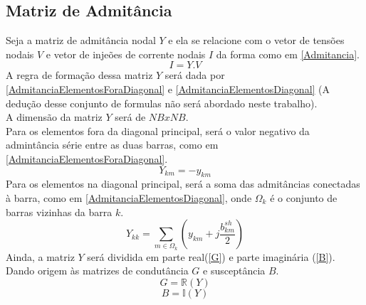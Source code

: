 




\subsection{Matriz de Admitância}
Seja a matriz de admitância nodal $Y$ e ela se relacione com o vetor de tensões nodais $V$ e vetor de injeões de corrente nodais $I$ da forma como em \ref{Admitancia}.
\begin{equation}
    I = Y.V
    \label{Admitancia}
\end{equation}
A regra de formação dessa matriz $Y$ será dada por \ref{AdmitanciaElementosForaDiagonal} e \ref{AdmitanciaElementosDiagonal} (A dedução desse conjunto de formulas não será abordado neste trabalho).\\
A dimensão da matriz $Y$ será de $NBxNB$.\\
Para os elementos fora da diagonal principal, será o valor negativo da admintância série entre as duas barras, como em \ref{AdmitanciaElementosForaDiagonal}.
\begin{equation}
    Y_{km} = -y_{km}
    \label{AdmitanciaElementosForaDiagonal}
\end{equation}
Para os elementos na diagonal principal, será a soma das admitâncias conectadas à barra, como em \ref{AdmitanciaElementosDiagonal}, onde $\Omega_k$ é o conjunto de barras vizinhas da barra $k$.
\begin{equation}
    Y_{kk} = \sum_{m\in \Omega_k} \left(y_{km} + j\frac{b^{sh}_{km}}{2}\right)
    \label{AdmitanciaElementosDiagonal}
\end{equation}
Ainda, a matriz $Y$ será dividida em parte real(\ref{G}) e parte imaginária (\ref{B}). Dando origem às matrizes de condutância $G$ e susceptância $B$.
\begin{equation}
    G = \mathbb{R} (Y)
    \label{G}
\end{equation}
\begin{equation}
    B = \mathbb{I} (Y)
    \label{B}
\end{equation}





